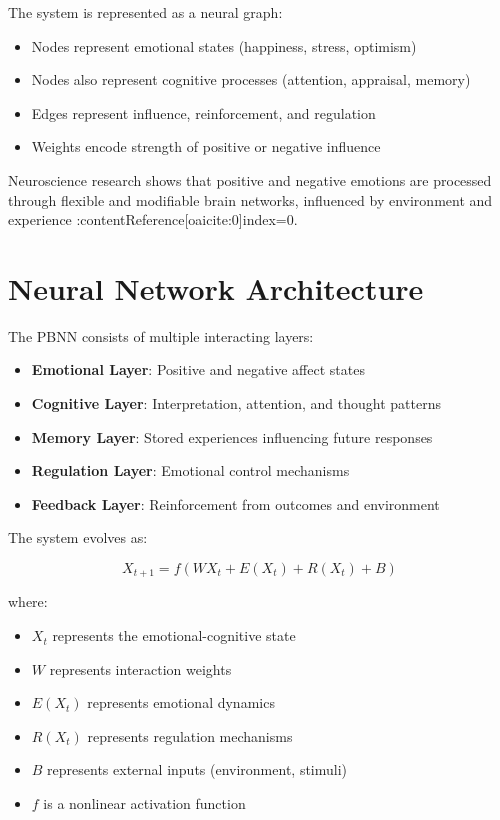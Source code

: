 \documentclass[12pt]{article}
\begin{document}
The system is represented as a neural graph:

\begin{itemize}
\item Nodes represent emotional states (happiness, stress, optimism)
\item Nodes also represent cognitive processes (attention, appraisal, memory)
\item Edges represent influence, reinforcement, and regulation
\item Weights encode strength of positive or negative influence
\end{itemize}

Neuroscience research shows that positive and negative emotions are processed through flexible and modifiable brain networks, influenced by environment and experience :contentReference[oaicite:0]{index=0}.

\section{Neural Network Architecture}

The PBNN consists of multiple interacting layers:

\begin{itemize}
\item \textbf{Emotional Layer}: Positive and negative affect states
\item \textbf{Cognitive Layer}: Interpretation, attention, and thought patterns
\item \textbf{Memory Layer}: Stored experiences influencing future responses
\item \textbf{Regulation Layer}: Emotional control mechanisms
\item \textbf{Feedback Layer}: Reinforcement from outcomes and environment
\end{itemize}

The system evolves as:

\[
X_{t+1} = f(WX_t + E(X_t) + R(X_t) + B)
\]

where:
\begin{itemize}
\item $X_t$ represents the emotional-cognitive state
\item $W$ represents interaction weights
\item $E(X_t)$ represents emotional dynamics
\item $R(X_t)$ represents regulation mechanisms
\item $B$ represents external inputs (environment, stimuli)
\item $f$ is a nonlinear activation function
\end{itemize}
\end{document}
